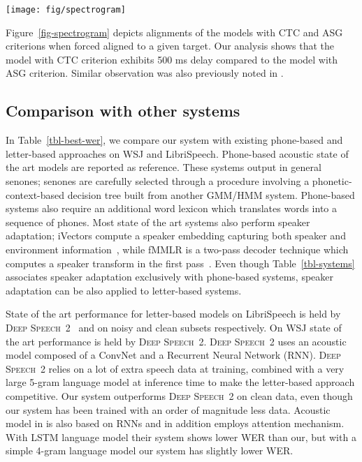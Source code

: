 \documentclass{article}
\begin{document}
\begin{figure*}
\centering
  \texttt{[image: fig/spectrogram]}
  \caption{
    \label{fig-spectrogram}
Comparison of alignments produced by the models with CTC (top) and ASG (bottom) criterions on audio spectrogram over time (each time frame on \emph{X} axis corresponds to a 40ms window with 10 ms stride).
  }
\end{figure*}

Figure~\ref{fig-spectrogram} depicts alignments of the models with CTC and ASG criterions when forced aligned to a given target. Our analysis shows that the model with CTC criterion exhibits 500 ms delay compared to the model with ASG criterion. Similar observation was also previously noted in \cite{sak2015acoustic}.

\subsection{Comparison with other systems}

In Table~\ref{tbl-best-wer}, we compare
our system with existing phone-based and letter-based approaches on WSJ and
LibriSpeech. Phone-based acoustic state of the art models are
reported as reference. These systems output in general senones; senones are
carefully selected through a procedure involving a phonetic-context-based
decision tree built from another GMM/HMM system. Phone-based systems also
require an additional word lexicon which translates words into a sequence
of phones. Most state of the art systems also perform speaker adaptation;
iVectors compute a speaker embedding capturing both speaker and environment
information~\citep{xue2015ivectors}, while fMMLR is a two-pass decoder
technique which computes a speaker transform in the first
pass~\citep{gales1996fmllr}. Even though Table~\ref{tbl-systems} associates speaker
adaptation exclusively with phone-based systems, speaker adaptation can be also applied to letter-based systems.

State of the art performance for letter-based models on LibriSpeech is held by \textsc{Deep Speech~2}~\citep{amodei2015deep} and  \citep{zeyer2018improved} 
on noisy and clean subsets respectively. On WSJ state of the art performance is held by \textsc{Deep Speech~2}.
\textsc{Deep Speech~2} uses an acoustic model composed of a ConvNet and
a Recurrent Neural Network (RNN). \textsc{Deep Speech~2} relies on
a lot of extra speech data at training, combined with a very large 5-gram
language model at inference time to make the letter-based approach
competitive. Our system outperforms \textsc{Deep Speech~2} on clean data, 
even though our system has been trained with an order of magnitude less data.
Acoustic model in \citep{zeyer2018improved} is also based on RNNs and in addition employs attention mechanism. With LSTM language model their system shows lower WER than our, but with a simple 4-gram language model our system has slightly lower WER.
\end{document}
